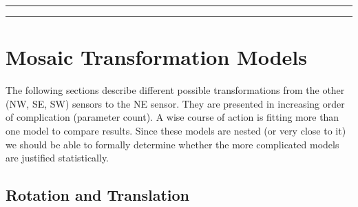 \documentclass{article}
\begin{document}
\hrule
\vspace{2mm}
\hrule
\vspace{5mm}


\pagebreak

\section{Mosaic Transformation Models}

The following sections describe different possible transformations from the
other (NW, SE, SW) sensors to the NE sensor. They are presented in increasing
order of complication (parameter count). A wise course of action is fitting
more than one model to compare results. Since these models are nested (or
very close to it) we should be able to formally determine whether the more
complicated models are justified statistically.

\subsection{Rotation and Translation}
\end{document}
